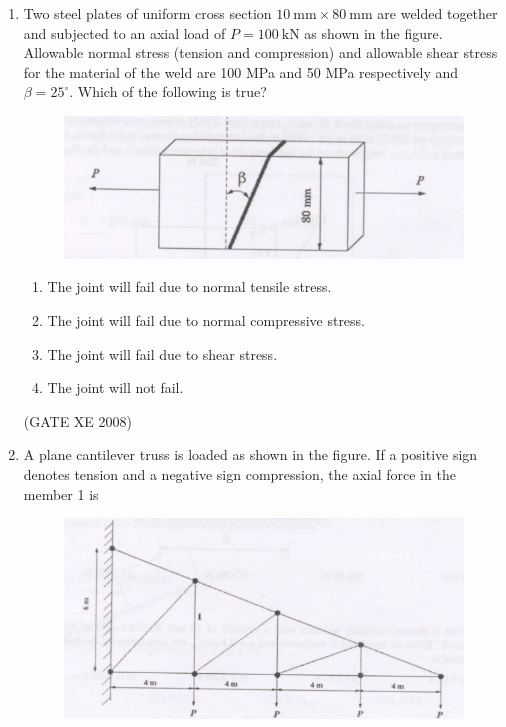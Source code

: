 \documentclass[12pt]{article}
\begin{document}
\begin{enumerate}
\begin{enumerate}
\end{enumerate}
    
    (GATE XE 2008)
    
    \item Two steel plates of uniform cross section $10 \ \mathrm{mm} \times 80 \ \mathrm{mm}$ are welded together and subjected to an axial load of $P=100 \ \mathrm{kN}$ as shown in the figure. Allowable normal stress (tension and compression) and allowable shear stress for the material of the weld are 100 MPa and 50 MPa respectively and $\beta = 25^\circ$. Which of the following is true?

    \begin{figure}[H]
\centering
  \includegraphics[width=0.7\columnwidth]{figs/ass1_f_q15.png}
  \caption{}
\end{figure}

\begin{enumerate}
\item  The joint will fail due to normal tensile stress.
\item  The joint will fail due to normal compressive stress.
\item  The joint will fail due to shear stress.
\item  The joint will not fail.
\end{enumerate}
    
    (GATE XE 2008)
    
    \item A plane cantilever truss is loaded as shown in the figure. If a positive sign denotes tension and a negative sign compression, the axial force in the member 1 is

     \begin{figure}[H]
    \centering
    \includegraphics[width=0.7\columnwidth]{figs/ass1_f_q16.png}
    \caption{}
\end{figure}


\end{enumerate}
\end{document}
